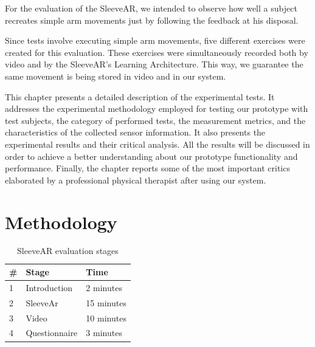 For the evaluation of the SleeveAR, we intended to observe how well a subject recreates simple arm movements just by following the feedback at his disposal. 

Since tests involve executing simple arm movements, five different exercises were created for this evaluation.  These exercises were simultaneously recorded both by video and by the SleeveAR's Learning Architecture. This way, we guarantee the same movement is being stored in video and in our system.

This chapter presents a detailed description of the experimental tests. It addresses the experimental methodology employed for testing our prototype with test subjects, the category of performed tests, the measurement metrics, and the characteristics of the collected sensor information. It also presents the experimental results and their critical analysis. All the results will be discussed in order to achieve a better understanding about our prototype functionality and performance.
Finally, the chapter reports some of the most important critics elaborated by a professional physical therapist after using our system.

\section{Methodology} \label{evaluation-methodology}

\begin{table}
\centering
\begin{tabular}{lll}
\hline
\multicolumn{1}{|l|}{\#}& \multicolumn{1}{l|}{Stage}         & \multicolumn{1}{l|}{Time}       \\ \hline
\multicolumn{1}{|l|}{1} & \multicolumn{1}{l|}{Introduction}  & \multicolumn{1}{l|}{2 minutes}  \\ \hline
\multicolumn{1}{|l|}{2} & \multicolumn{1}{l|}{SleeveAr}      & \multicolumn{1}{l|}{15 minutes} \\ \hline
\multicolumn{1}{|l|}{3} & \multicolumn{1}{l|}{Video}         & \multicolumn{1}{l|}{10 minutes} \\ \hline
\multicolumn{1}{|l|}{4} & \multicolumn{1}{l|}{Questionnaire} & \multicolumn{1}{l|}{3 minutes}  \\ \hline
\end{tabular}
\caption{SleeveAR evaluation stages}
\label{table:teststages}
\end{table}



